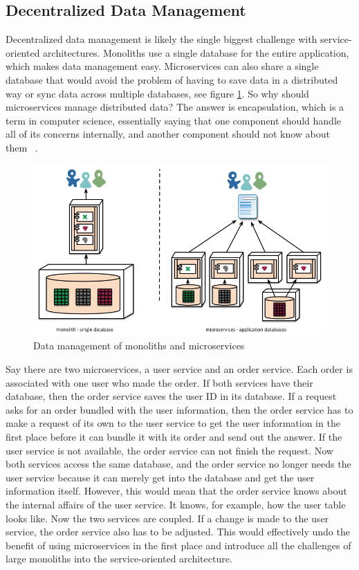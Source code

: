 \subsection{Decentralized Data Management}
\label{sec:theory:decentralized-data}

Decentralized data management is likely the single biggest challenge with service-oriented architectures. Monoliths use a single database for the entire application, which makes data management easy. Microservices can also share a single database that would avoid the problem of having to save data in a distributed way or sync data across multiple databases, see figure \ref{fig:decentralised-data}. So why should microservices manage distributed data? The answer is encapsulation, which is a term in computer science, essentially saying that one component should handle all of its concerns internally, and another component should not know about them ~\cite{krivtsov.2019}.

\begin{figure}[ht!]
  \centering
  \includegraphics[width=0.7\linewidth]{assets/decentralised-data.png}
  \caption[Data management of monoliths and microservices]{Data management of monoliths and microservices ~\cite{microservices.2014}}
  \label{fig:decentralised-data}
\end{figure}

Say there are two microservices, a user service and an order service. Each order is associated with one user who made the order. If both services have their database, then the order service saves the user ID in its database. If a request asks for an order bundled with the user information, then the order service has to make a request of its own to the user service to get the user information in the first place before it can bundle it with its order and send out the answer. If the user service is not available, the order service can not finish the request. Now both services access the same database, and the order service no longer needs the user service because it can merely get into the database and get the user information itself. However, this would mean that the order service knows about the internal affairs of the user service. It knows, for example, how the user table looks like. Now the two services are coupled. If a change is made to the user service, the order service also has to be adjusted. This would effectively undo the benefit of using microservices in the first place and introduce all the challenges of large monoliths into the service-oriented architecture.

